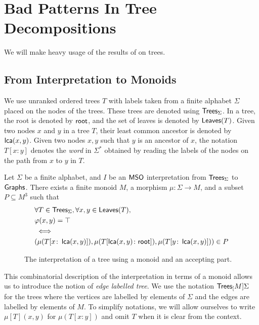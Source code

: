 \section{Bad Patterns In Tree Decompositions}
\label{sec:bad-patterns}

We will make heavy usage of the results of \cite{COLC07} on trees.

\subsection{From Interpretation to Monoids}

\AP We use unranked ordered trees $T$ with labels taken from a finite alphabet
$\Sigma$ placed on the nodes of the trees. These trees are denoted using
$\mathsf{Trees}_{\Sigma}$. In a tree, the root is denoted by $\mathsf{root}$, and the set of
leaves is denoted by $\mathsf{Leaves}(T)$. Given two nodes $x$ and $y$ in a tree $T$,
their least common ancestor is denoted by $\mathop{\mathsf{lca}}(x,y)$. Given two nodes $x,y$
such that $y$ is an ancestor of $x$, the notation $T[x:y]$ denotes the
\emph{word} in $\Sigma^*$ obtained by reading the labels of the nodes on the
path from $x$ to $y$ in $T$. 

\begin{lemma}
    \label{interpretation-to-monoid:lem}
    Let $\Sigma$ be a finite alphabet, and $I$ be an $\mathsf{MSO}$ interpretation
    from $\mathsf{Trees}_{\Sigma}$ to $\Graphs$.
    There exists a finite monoid $M$, a morphism
    $\mu \colon \Sigma \to M$,
    and a subset $P \subseteq M^3$ such that
    \begin{align*}
        &\forall T \in \mathsf{Trees}_{\Sigma},
        \forall x,y \in \mathsf{Leaves}(T), \\
        &\varphi(x,y) = \top \\
        &\iff \\
        &(\mu(T[x \colon \mathop{\mathsf{lca}}(x,y)]), 
          \mu(T[\mathop{\mathsf{lca}}(x,y) \colon \mathsf{root}]), 
          \mu(T[y \colon \mathop{\mathsf{lca}}(x,y)])) \in P
    \end{align*}
\end{lemma}

\begin{figure}
    \centering
    \caption{The interpretation of a tree using a monoid and an accepting part.}
    \label{interpretation-to-monoid:fig}
\end{figure}

\AP This combinatorial description of the interpretation in terms of a monoid
allows us to introduce the notion of \emph{edge labelled tree}. We use the
notation $\mathsf{Trees}_{[}M]{\Sigma}$ for the trees where the vertices are labelled by
elements of $\Sigma$ and the edges are labelled by elements of $M$. To simplify
notations, we will allow ourselves to write $\mu[T](x,y)$ for $\mu(T[x \colon
y])$ and omit $T$ when it is clear from the context.

